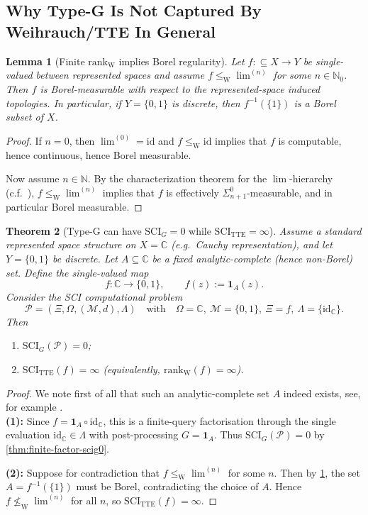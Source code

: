 \documentclass{lmcs} %
\theoremstyle{plain}
\theoremstyle{plain}
\newtheorem{theorem}{Theorem}[section]
\newtheorem{lemma}[theorem]{Lemma}
\theoremstyle{definition}
\theoremstyle{remark}
\theoremstyle{definition}
\theoremstyle{remark}
\numberwithin{equation}{section}
\newcommand{\NN}{\mathbb{N}}
\newcommand{\C}{\mathbb{C}}
\newcommand{\Lim}{\operatorname{lim}}
\newcommand{\Limi}[1]{\Lim^{(#1)}}
\begin{document}
\subsection{Why Type-G Is Not Captured By Weihrauch/TTE In General}

\begin{lemma}[Finite $\mathrm{rank}_{\mathrm W}$ implies Borel regularity]\label{lem:borel-regularity}
Let $f:\subseteq X\to Y$ be single-valued between represented spaces and assume
$f\le_{\mathrm W}\Limi{n}$ for some $n \in \NN_0$.
Then $f$ is Borel-measurable with respect to the represented-space induced topologies.
In particular, if $Y=\{0,1\}$ is discrete, then $f^{-1}(\{1\})$ is a Borel subset of $X$.
\end{lemma}

\begin{proof}
If $n=0$, then $\Limi{0}=\mathrm{id}$ and $f\le_{\mathrm W}\mathrm{id}$ implies that $f$ is computable,
hence continuous, hence Borel measurable.

Now assume $n\in\NN$. By the characterization theorem for the $\Lim$-hierarchy (c.f.\ \cite[Thm.~6.5]{brattka2021weihrauch}),
$f\le_{\mathrm W}\Limi{n}$ implies that $f$ is effectively $\Sigma^0_{n+1}$-measurable, and in particular
Borel measurable.
\end{proof}

\begin{theorem}[Type-G can have $\mathrm{SCI}_G=0$ while $\mathrm{SCI}_{\mathrm{TTE}}=\infty$]\label{thm:scig0-but-tteinf}
Assume a standard represented space structure on $X=\C$ (e.g.\ Cauchy representation),
and let $Y=\{0,1\}$ be discrete.
Let $A\subseteq \C$ be a fixed analytic-complete (hence non-Borel) set.
Define the single-valued map
\[
f:\C\to\{0,1\},\qquad f(z):=\mathbf{1}_A(z).
\]
Consider the SCI computational problem
\[
\mathcal{P}=(\Xi,\Omega,(\mathcal{M},d),\Lambda)
\quad\text{with}\quad
\Omega=\C,\ \mathcal{M}=\{0,1\},\ \Xi=f,\ \Lambda=\{\mathrm{id}_\C\}.
\]
Then
\begin{enumerate}
\item $\mathrm{SCI}_G(\mathcal{P})=0$;
\item $\mathrm{SCI}_{\mathrm{TTE}}(f)=\infty$ (equivalently, $\mathrm{rank}_{\mathrm W}(f)=\infty$).
\end{enumerate}
\end{theorem}

\begin{proof}
We note first of all that such an analytic-complete set $A$ indeed exists, see, for example \cite[Sec.~25]{Kec95}.\\
\textbf{(1):} Since $f=\mathbf{1}_A\circ \mathrm{id}_\C$, this is a finite-query factorisation
through the single evaluation $\mathrm{id}_\C\in\Lambda$ with post-processing $G=\mathbf{1}_A$.
Thus $\mathrm{SCI}_G(\mathcal{P})=0$ by \cref{thm:finite-factor-scig0}.

\textbf{(2):} Suppose for contradiction that $f\le_{\mathrm W}\Limi{n}$ for some $n$.
Then by \cref{lem:borel-regularity}, the set $A=f^{-1}(\{1\})$ must be Borel,
contradicting the choice of $A$. Hence $f\not\le_{\mathrm W}\Limi{n}$ for all $n$, so $\mathrm{SCI}_{\mathrm{TTE}}(f)=\infty$.
\end{proof}
\end{document}

